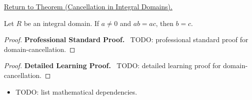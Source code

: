 \newpage
{}
\label{prf:domain-cancellation}

\begin{remark*}[Return]
\hyperref[prop:domain-cancellation]{Return to Theorem (Cancellation in Integral Domains).}
\end{remark*}

\begin{theorem*}
Let $R$ be an integral domain.  If $a\neq 0$ and $ab=ac$, then $b=c$.
\end{theorem*}

\begin{proof}
\textbf{Professional Standard Proof.}~
TODO: professional standard proof for domain-cancellation.
\end{proof}

\begin{proof}
\textbf{Detailed Learning Proof.}~
TODO: detailed learning proof for domain-cancellation.
\end{proof}

\begin{remark*}
\end{remark*}

\begin{dependencies}
\begin{itemize}
  \item TODO: list mathematical dependencies.
\end{itemize}
\end{dependencies}

\clearpage
